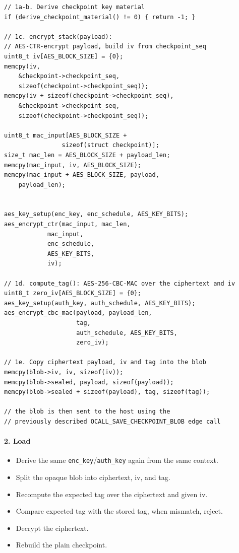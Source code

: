 \documentclass[11pt,a4paper]{report}
\begin{document}
\begin{verbatim}
// 1a-b. Derive checkpoint key material
if (derive_checkpoint_material() != 0) { return -1; }

// 1c. encrypt_stack(payload): 
// AES-CTR-encrypt payload, build iv from checkpoint_seq
uint8_t iv[AES_BLOCK_SIZE] = {0};
memcpy(iv, 
    &checkpoint->checkpoint_seq, 
    sizeof(checkpoint->checkpoint_seq));
memcpy(iv + sizeof(checkpoint->checkpoint_seq), 
    &checkpoint->checkpoint_seq, 
    sizeof(checkpoint->checkpoint_seq));

uint8_t mac_input[AES_BLOCK_SIZE + 
                sizeof(struct checkpoint)];
size_t mac_len = AES_BLOCK_SIZE + payload_len;
memcpy(mac_input, iv, AES_BLOCK_SIZE);
memcpy(mac_input + AES_BLOCK_SIZE, payload, 
    payload_len);

                
aes_key_setup(enc_key, enc_schedule, AES_KEY_BITS);
aes_encrypt_ctr(mac_input, mac_len, 
            mac_input, 
            enc_schedule, 
            AES_KEY_BITS, 
            iv);

// 1d. compute_tag(): AES-256-CBC-MAC over the ciphertext and iv
uint8_t zero_iv[AES_BLOCK_SIZE] = {0};
aes_key_setup(auth_key, auth_schedule, AES_KEY_BITS);
aes_encrypt_cbc_mac(payload, payload_len, 
                    tag, 
                    auth_schedule, AES_KEY_BITS, 
                    zero_iv);

// 1e. Copy ciphertext payload, iv and tag into the blob
memcpy(blob->iv, iv, sizeof(iv));
memcpy(blob->sealed, payload, sizeof(payload));
memcpy(blob->sealed + sizeof(payload), tag, sizeof(tag));

// the blob is then sent to the host using the 
// previously described OCALL_SAVE_CHECKPOINT_BLOB edge call
\end{verbatim}


\paragraph{2. Load}
\begin{itemize}
    \item[a)] Derive the same \texttt{enc\_key}/\texttt{auth\_key} again from
    the same context.
    \item[b)] Split the opaque blob into ciphertext, iv, and tag.
    \item[c)] Recompute the expected tag over the ciphertext and given iv.
    \item[d)] Compare expected tag with the stored tag, when mismatch, reject.
    \item[e)] Decrypt the ciphertext.
    \item[f)] Rebuild the plain checkpoint.
\end{itemize}
\end{document}
